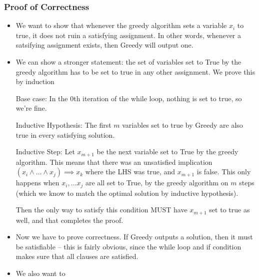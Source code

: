	\subsubsection{Proof of Correctness}
	\begin{itemize}
		\item We want to show that whenever the greedy algorithm sets a variable $x_i$ to true, it does not 
			ruin a satisfying assignment. In other words, whenever a satsifying assignment exists, 
			then Greedy will output one.
		\item We can show a stronger statement: the set of variables set to True by the greedy algorithm 
			has to be set to true in any other assignment. We prove this by induction 

			Base case: In the 0th iteration of the while loop, nothing is set to true, so we're fine.

			Inductive Hypothesis: The first $m$ variables set to true by Greedy are also true in every satisfying
			solution.

			Inductive Step: Let $x_{m+1}$ be the next variable set to True by the greedy algorithm.
			This means that there was an unsatisfied implication $(x_i \land \dots \land x_j) \implies x_k$ 
			where the LHS was true, and $x_{m+1}$ is false. This only happens when $x_i, \dots x_j$ are all 
			set to True, by the greedy algorithm on $m$ steps (which we know to match the optimal solution by 
			inductive hypothesis).

			Then the only way to satisfy this condition MUST have $x_{m+1}$ set to true as well, and that 
			completes the proof.
		\item Now we have to prove correctness. If Greedy outputs a solution, then it must be satisfiable --
			this is fairly obvious, since the while loop and if condition makes sure that all clauses are 
			satisfied. 
		\item We also want to 
	\end{itemize}
